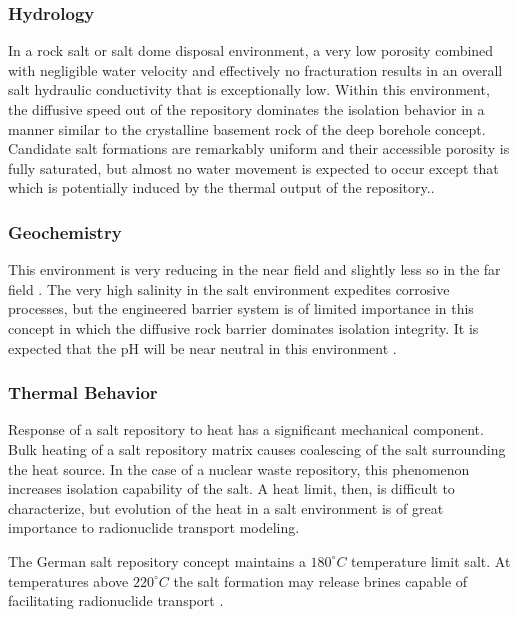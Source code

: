 \subsubsection{Hydrology}

In a rock salt or salt dome disposal environment, a very low porosity combined 
with negligible water velocity and effectively no fracturation results in an overall 
salt hydraulic conductivity that is exceptionally low. Within this environment, the  
diffusive speed out of the repository dominates the isolation behavior in a 
manner similar to the crystalline basement rock of the deep borehole concept. 
Candidate salt formations are remarkably uniform and their accessible porosity is 
fully saturated, but almost no water movement is expected to occur except that 
which is potentially induced by the thermal output of the repository..

\subsubsection{Geochemistry}

This environment is very reducing in the near field and slightly less so in 
the far field \cite{clayton_generic_2011}. The very high salinity in the salt
environment expedites corrosive processes, but the engineered barrier system 
is of limited importance in this concept in which the diffusive rock barrier 
dominates isolation integrity.  It is expected that the pH will be near
neutral in this environment \cite{von_lensa_red-impact_2008, clayton_generic_2011}.

\subsubsection{Thermal Behavior}
\label{subsec:saltthermal}

Response of a salt repository to heat has a significant
mechanical component. Bulk heating of a salt repository matrix causes
coalescing  of the salt surrounding the heat source. In the case of a nuclear
waste repository, this phenomenon increases isolation capability of the salt. A
heat limit, then, is difficult to characterize, but evolution of the heat in a
salt environment is of great importance to radionuclide transport modeling. 

The German salt repository concept maintains a $180^\circ C$ temperature limit 
salt. At temperatures above $220^\circ C$ the salt formation may release 
brines capable of facilitating radionuclide transport 
\cite{von_lensa_red-impact_2008, brewitz_long-term_2002}.

